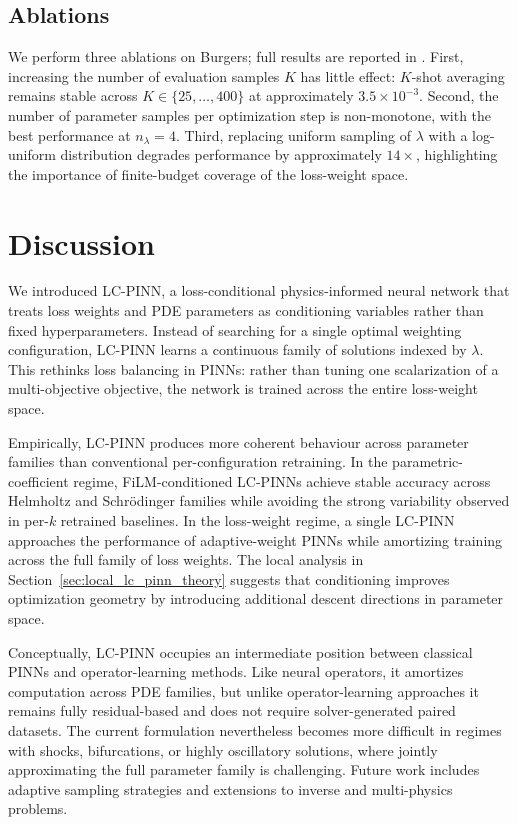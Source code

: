 \documentclass{article}
\theoremstyle{plain}
\theoremstyle{definition}
\theoremstyle{remark}
\begin{document}
\subsection{Ablations}
\label{sec:results-ablations}

We perform three ablations on Burgers; full results are reported in
. First, increasing the number of
evaluation samples $K$ has little effect: $K$-shot averaging remains
stable across $K\in\{25,\ldots,400\}$ at approximately
$3.5\times10^{-3}$. Second, the number of parameter samples per
optimization step is non-monotone, with the best performance at
$n_\lambda=4$. Third, replacing uniform sampling of $\lambda$ with a
log-uniform distribution degrades performance by approximately
$14\times$, highlighting the importance of finite-budget coverage of
the loss-weight space.

\section{Discussion}
\label{sec:discussion}

We introduced LC-PINN, a loss-conditional physics-informed neural network that treats loss weights and PDE parameters as conditioning variables rather than fixed hyperparameters. Instead of searching for a single optimal weighting configuration, LC-PINN learns a continuous family of solutions indexed by $\lambda$. This rethinks loss balancing in PINNs: rather than tuning one scalarization of a multi-objective objective, the network is trained across the entire loss-weight space.

Empirically, LC-PINN produces more coherent behaviour across parameter families than conventional per-configuration retraining. In the parametric-coefficient regime, FiLM-conditioned LC-PINNs achieve stable accuracy across Helmholtz and Schrödinger families while avoiding the strong variability observed in per-$k$ retrained baselines. In the loss-weight regime, a single LC-PINN approaches the performance of adaptive-weight PINNs while amortizing training across the full family of loss weights. The local analysis in Section~\ref{sec:local_lc_pinn_theory} suggests that conditioning improves optimization geometry by introducing additional descent directions in parameter space.

Conceptually, LC-PINN occupies an intermediate position between classical PINNs and operator-learning methods. Like neural operators, it amortizes computation across PDE families, but unlike operator-learning approaches it remains fully residual-based and does not require solver-generated paired datasets. The current formulation nevertheless becomes more difficult in regimes with shocks, bifurcations, or highly oscillatory solutions, where jointly approximating the full parameter family is challenging. Future work includes adaptive sampling strategies and extensions to inverse and multi-physics problems.
\end{document}
